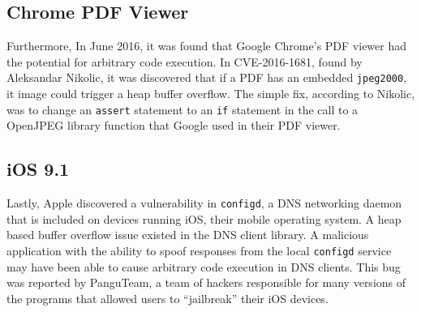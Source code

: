 \subsection{Chrome PDF Viewer}

Furthermore, In June 2016, it was found that Google Chrome’s PDF viewer had the potential for arbitrary code execution. In CVE-2016-1681, found by Aleksandar Nikolic, it was discovered that if a PDF has an embedded \texttt{jpeg2000}, it image could trigger a heap buffer overflow. The simple fix, according to Nikolic, was to change an \texttt{assert} statement to an \texttt{if} statement in the call to a  OpenJPEG library function that Google used in their PDF viewer. \cite{chrome_pdf_2016}

\subsection{iOS 9.1}

Lastly, Apple discovered a vulnerability in \texttt{configd}, a DNS networking daemon that is included on devices running iOS, their mobile operating system. A heap based buffer overflow issue existed in the DNS client library. A malicious application with the ability to spoof responses from the local \texttt{configd} service may have been able to cause arbitrary code execution in DNS clients. This bug was reported by PanguTeam, a team of hackers responsible for many versions of the programs that allowed users to “jailbreak” their iOS devices. \cite{apple_ios_2016}
